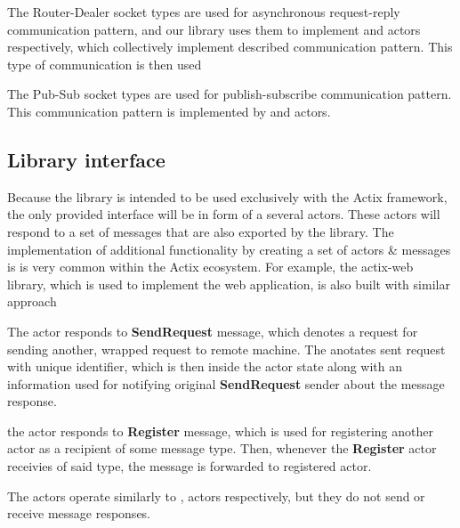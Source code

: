 The Router-Dealer socket types are used for asynchronous request-reply communication pattern, and our library uses
them to implement  and  actors respectively, which collectively implement described communication pattern.
This type of communication is then used

The Pub-Sub socket types are used for publish-subscribe communication pattern. This communication pattern is implemented
by  and  actors.


\subsection{Library interface}
Because the library is intended to be used exclusively with the Actix framework, the only provided interface will be in form
of a several actors. These actors will respond to a set of messages that are also exported by the library.
The implementation of additional functionality by creating a set of actors \& messages is is very common within the Actix ecosystem.
For example, the actix-web library, which is used to implement the web application, is also built with similar approach

The  actor responds to \textbf{SendRequest} message, which denotes a request for sending another, wrapped
request to remote machine. The  anotates sent request with unique identifier, which is then inside the
actor state along with an information used for notifying original \textbf{SendRequest} sender about the message response.

the  actor responds to \textbf{Register} message, which is used for registering another actor
as a recipient of some message type. Then, whenever the \textbf{Register} actor receivies of said type, the message
is forwarded to registered actor.

The   actors operate similarly to ,  actors respectively,
but they do not send or receive message responses.

